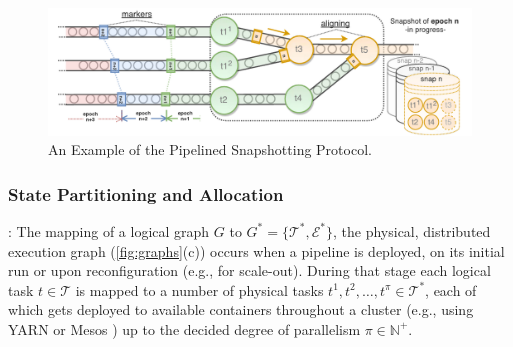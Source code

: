 



\begin{figure}[t]
\centering
\includegraphics[width=\textwidth]{figures/snapshots-overview.pdf}
\vspace*{-10mm}
\caption{An Example of the Pipelined Snapshotting Protocol.} 
\label{fig:snapshots-overview}
\vspace{-4mm}
\end{figure}


\subsubsection{State Partitioning and Allocation}

: The mapping of a logical graph $G$ to $G^* = \{\mathcal{T^*}, \mathcal{E^*}\}$, the physical, distributed execution graph (\autoref{fig:graphs}(c)) occurs when a pipeline is deployed, on its initial run or upon reconfiguration (e.g., for scale-out). During that stage each logical task $t \in \mathcal{T}$ is mapped to a number of physical tasks $t^1, t^2, \ldots, t^\pi \in \mathcal{T^*}$, each of which gets deployed to available containers throughout a cluster (e.g., using YARN \cite{vavilapalli2013apache} or Mesos \cite{hindman2011mesos}) up to the decided degree of parallelism $\pi \in \mathbb{N^+}$. 

